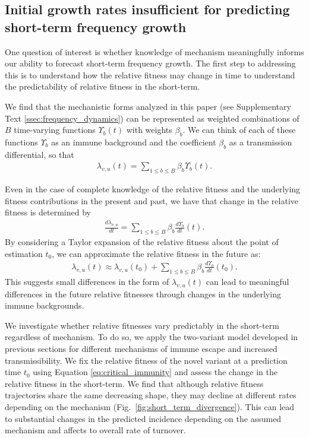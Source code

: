 \documentclass[11pt,oneside,letterpaper]{article}
\begin{document}
\subsection*{Initial growth rates insufficient for predicting short-term frequency growth}

One question of interest is whether knowledge of mechanism meaningfully informs our ability to forecast short-term frequency growth.
The first step to addressing this is to understand how the relative fitness may change in time to understand the predictability of relative fitness in the short-term.

We find that the mechanistic forms analyzed in this paper (see Supplementary Text \ref{ssec:frequency_dynamics}) can be represented as weighted combinations of $B$ time-varying functions $\Upsilon_{b}(t)$ with weights $\beta_{b}$.
We can think of each of these functions $\Upsilon_b$ as an immune background and the coefficient $\beta_{b}$ as a transmission differential, so that
\begin{align*}
\lambda_{v,u}(t) = \sum_{1 \leq b \leq B} \beta_{b} \Upsilon_{b}(t).
\end{align*}

Even in the case of complete knowledge of the relative fitness and the underlying fitness contributions in the present and past, we have that change in the relative fitness is determined by
\begin{align*}
    \frac{d\lambda_{v,u}}{dt} = \sum_{1 \leq b \leq B} \beta_{b} \frac{d\Upsilon_{b}}{dt}(t).
\end{align*}
By considering a Taylor expansion of the relative fitness about the point of estimation $t_{0}$, we can approximate the relative fitness in the future as:
\begin{align*}
    \lambda_{v,u}(t) \approx \lambda_{v,u}(t_{0}) + \sum_{1\leq b \leq B} \beta_b \frac{d\Upsilon_b}{dt}(t_0).
\end{align*}
This suggests small differences in the form of $\lambda_{v,u}(t)$ can lead to meaningful differences in the future relative fitnesses through changes in the underlying immune backgrounds.

We investigate whether relative fitnesses vary predictably in the short-term regardless of mechanism.
To do so, we apply the two-variant model developed in previous sections for different mechanisms of immune escape and increased transmissibility.
We fix the relative fitness of the novel variant at a prediction time $t_{0}$ using Equation \ref{eq:critical_immunity} and assess the change in the relative fitness in the short-term.
We find that although relative fitness trajectories share the same decreasing shape, they may decline at different rates depending on the mechanism (Fig.~\ref{fig:short_term_divergence}).
This can lead to substantial changes in the predicted incidence depending on the assumed mechanism and affects to overall rate of turnover.
\end{document}
